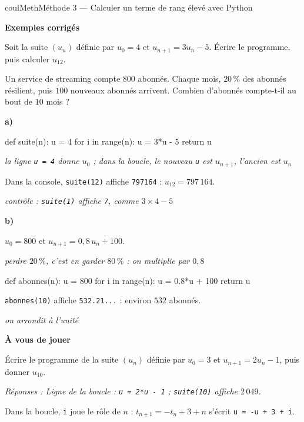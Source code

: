 \documentclass[11pt,a4paper]{article}
\makeatletter
\newcounter{lycee@signet}
\newcommand{\signet}[3][]{\stepcounter{lycee@signet}%
  \edef\lycee@dest{\if\relax\detokenize{#1}\relax
    signet.\arabic{lycee@signet}\else#1\fi}%
  \hypertarget{\lycee@dest}{}\bookmark[level=#2,dest=\lycee@dest]{#3}}
\newcommand{\res}[1]{#1}
\newcounter{methode}
\newenvironment{methodebox}[1][Méthode]{\stepcounter{methode}%
  \begin{boitecours}[phantom={\signet[methode-\arabic{methode}]{2}{#1}}]{coulMeth}{#1}}%
  {\end{boitecours}}
\newcommand{\etape}[1]{\par\smallskip\textbf{\color{coulMeth}#1}\par\nobreak\smallskip}
\newcommand{\reponse}[1]{\par\smallskip
  {\footnotesize\itshape\color{black!55}Réponses : #1}}
\newcommand{\explique}[2]{\par\smallskip\noindent
  \begin{minipage}[t]{0.57\linewidth}\raggedright #1\end{minipage}\hfill
  \begin{minipage}[t]{0.40\linewidth}\raggedright\leavevmode
    {\small\itshape\color{black!60}#2}\end{minipage}\par}
\newcommand{\cas}[1]{\par\smallskip\noindent\textbf{\color{coulExo}#1}\vadjust{\nobreak}}
\newenvironment{correction}{\par}{\par}
\newcommand{\etapeexemples}{\etape{Exemples corrigés}}
\makeatother
\begin{document}
\begin{methodebox}[Méthode 3 --- Calculer un terme de rang élevé avec Python]
\etapeexemples
\begin{questions}[label=\alph*)]
  \item Soit la suite $(u_{n})$ définie par $u_{0}=4$ et $u_{n+1}=3u_{n}-5$. Écrire le programme, puis calculer
        $u_{12}$.
  \item Un service de streaming compte $800$ abonnés. Chaque mois, $20\,\%$ des abonnés
        résilient, puis $100$ nouveaux abonnés arrivent. Combien d'abonnés compte-t-il au
        bout de $10$ mois ?
\end{questions}
\begin{correction}
\cas{a)}\par\nopagebreak
\noindent
\begin{minipage}[t]{0.42\linewidth}\vspace{0pt}
\begin{python}
def suite(n):
    u = 4
    for i in range(n):
        u = 3*u - 5
    return u
\end{python}
\end{minipage}\hfill
\begin{minipage}[t]{0.54\linewidth}\vspace{0pt}\raggedright
{\small\itshape\color{black!60}la ligne \texttt{u = 4} donne $u_{0}$ ; dans la boucle, le
nouveau \texttt{u} est $u_{n+1}$, l'ancien est $u_{n}$}
\end{minipage}
\explique{Dans la console, \texttt{suite(12)} affiche \texttt{797164} : $u_{12}=\res{797\,164}$.}{%
contrôle : \texttt{suite(1)} affiche \texttt{7}, comme $3\times 4-5$}
\cas{b)}
\explique{$u_{0}=800$ et $u_{n+1}=0{,}8\,u_{n}+100$.}{perdre $20\,\%$, c'est en garder
$80\,\%$ : on multiplie par $0{,}8$}
\begin{python}
def abonnes(n):
    u = 800
    for i in range(n):
        u = 0.8*u + 100
    return u
\end{python}
\explique{\texttt{abonnes(10)} affiche \texttt{532.21...} : environ \res{$532$ abonnés}.}{on
arrondit à l'unité}
\end{correction}

\etape{À vous de jouer}
Écrire le programme de la suite $(u_{n})$ définie par $u_{0}=3$ et $u_{n+1}=2u_{n}-1$, puis donner
$u_{10}$.
\reponse{Ligne de la boucle : \texttt{u = 2*u - 1} ; \texttt{suite(10)} affiche
$2\,049$.}
\end{methodebox}

\begin{remarquebox}
Dans la boucle, \texttt{i} joue le rôle de $n$ : $t_{n+1}=-t_{n}+3+n$ s'écrit
\texttt{u = -u + 3 + i}.
\end{remarquebox}
\end{document}
